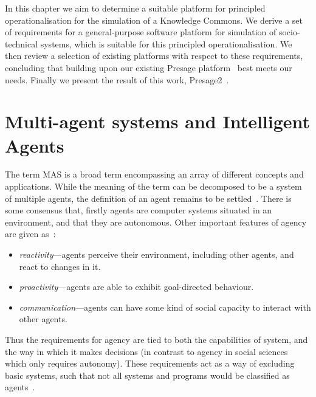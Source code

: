 In this chapter we aim to determine a suitable platform for principled
operationalisation for the simulation of a Knowledge Commons. We derive a set of
requirements for a general-purpose software platform for simulation of 
socio-technical systems, which is suitable for this principled operationalisation.
We then review a selection of existing platforms with respect to these
requirements, concluding that building upon our existing Presage
platform~\citep{Neville:2009} best meets our needs. Finally we present the
result of this work, Presage2~\citep{Macbeth2014}. %

%

\section{Multi-agent systems and Intelligent Agents}\label{sec:agents}

The term \ac{MAS} is a broad term encompassing an array of different concepts and applications. While the meaning of the term can be decomposed to be a system of multiple agents, the definition of an agent remains to be settled~\citep{Wooldridge2002}. There is some consensus that, firstly agents are computer systems situated in an environment, and that they are autonomous. Other important features of agency are given as~\citep{Wooldridge1995,HayesRoth1995}:
\begin{itemize}
\item \emph{reactivity}---agents perceive their environment, including other agents, and react to changes in it.
\item \emph{proactivity}---agents are able to exhibit goal-directed behaviour.
\item \emph{communication}---agents can have some kind of social capacity to interact with other agents.
\end{itemize}

Thus the requirements for agency are tied to both the capabilities of system, and the way in which it makes decisions (in contrast to agency in social sciences which only requires autonomy). These requirements act as a way of excluding basic systems, such that not all systems and programs would be classified as agents~\citep{Franklin1997}.

